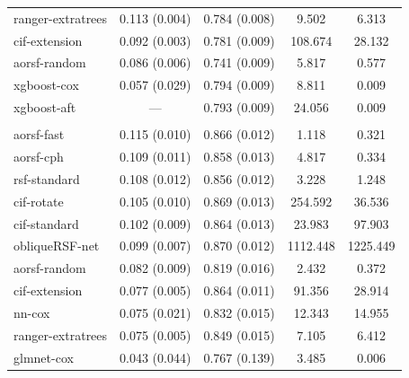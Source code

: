 \documentclass[12pt]{article}\usepackage[]{graphicx}\usepackage[]{xcolor}
\newenvironment{knitrout}{}{} %
\begin{document}
\begin{knitrout}
\begin{longtable}[t]{lcccc}
\hspace{1em}ranger-extratrees & 0.113 (0.004) & 0.784 (0.008) & 9.502 & 6.313\\
\hspace{1em}cif-extension & 0.092 (0.003) & 0.781 (0.009) & 108.674 & 28.132\\
\hspace{1em}aorsf-random & 0.086 (0.006) & 0.741 (0.009) & 5.817 & 0.577\\
\hspace{1em}xgboost-cox & 0.057 (0.029) & 0.794 (0.009) & 8.811 & 0.009\\
\hspace{1em}xgboost-aft & --- & 0.793 (0.009) & 24.056 & 0.009\\
\addlinespace[0.3em]
\multicolumn{5}{l}{\textit{\textbf{MESA; heart failure, n = 6785, p = 48}}}\\
\hline
\hspace{1em}aorsf-fast & 0.115 (0.010) & 0.866 (0.012) & 1.118 & 0.321\\
\hspace{1em}aorsf-cph & 0.109 (0.011) & 0.858 (0.013) & 4.817 & 0.334\\
\hspace{1em}rsf-standard & 0.108 (0.012) & 0.856 (0.012) & 3.228 & 1.248\\
\hspace{1em}cif-rotate & 0.105 (0.010) & 0.869 (0.013) & 254.592 & 36.536\\
\hspace{1em}cif-standard & 0.102 (0.009) & 0.864 (0.013) & 23.983 & 97.903\\
\hspace{1em}obliqueRSF-net & 0.099 (0.007) & 0.870 (0.012) & 1112.448 & 1225.449\\
\hspace{1em}aorsf-random & 0.082 (0.009) & 0.819 (0.016) & 2.432 & 0.372\\
\hspace{1em}cif-extension & 0.077 (0.005) & 0.864 (0.011) & 91.356 & 28.914\\
\hspace{1em}nn-cox & 0.075 (0.021) & 0.832 (0.015) & 12.343 & 14.955\\
\hspace{1em}ranger-extratrees & 0.075 (0.005) & 0.849 (0.015) & 7.105 & 6.412\\
\hspace{1em}glmnet-cox & 0.043 (0.044) & 0.767 (0.139) & 3.485 & 0.006\\

\end{longtable}
\end{knitrout}
\end{document}

